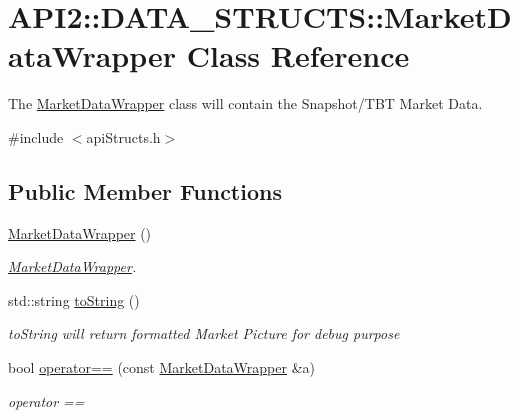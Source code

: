 \hypertarget{class_a_p_i2_1_1_d_a_t_a___s_t_r_u_c_t_s_1_1_market_data_wrapper}{\section{A\-P\-I2\-:\-:D\-A\-T\-A\-\_\-\-S\-T\-R\-U\-C\-T\-S\-:\-:Market\-Data\-Wrapper Class Reference}
\label{class_a_p_i2_1_1_d_a_t_a___s_t_r_u_c_t_s_1_1_market_data_wrapper}
}


The \hyperlink{class_a_p_i2_1_1_d_a_t_a___s_t_r_u_c_t_s_1_1_market_data_wrapper}{Market\-Data\-Wrapper} class will contain the Snapshot/\-T\-B\-T Market Data.  




{\ttfamily \#include $<$api\-Structs.\-h$>$}

\subsection*{Public Member Functions}
\begin{DoxyCompactItemize}
\item 
\hypertarget{class_a_p_i2_1_1_d_a_t_a___s_t_r_u_c_t_s_1_1_market_data_wrapper_aefd0fcbbcc35ac4d97543d62250d0534}{\hyperlink{class_a_p_i2_1_1_d_a_t_a___s_t_r_u_c_t_s_1_1_market_data_wrapper_aefd0fcbbcc35ac4d97543d62250d0534}{Market\-Data\-Wrapper} ()}\label{class_a_p_i2_1_1_d_a_t_a___s_t_r_u_c_t_s_1_1_market_data_wrapper_aefd0fcbbcc35ac4d97543d62250d0534}

\begin{DoxyCompactList}\small\item\em \hyperlink{class_a_p_i2_1_1_d_a_t_a___s_t_r_u_c_t_s_1_1_market_data_wrapper}{Market\-Data\-Wrapper}. \end{DoxyCompactList}\item 
std\-::string \hyperlink{class_a_p_i2_1_1_d_a_t_a___s_t_r_u_c_t_s_1_1_market_data_wrapper_a026ddf4c4988b38018e8f9634de5ce4b}{to\-String} ()
\begin{DoxyCompactList}\small\item\em to\-String will return formatted Market Picture for debug purpose \end{DoxyCompactList}\item 
bool \hyperlink{class_a_p_i2_1_1_d_a_t_a___s_t_r_u_c_t_s_1_1_market_data_wrapper_a92c80aea8b9dc7c934f18e52b76fcbc8}{operator==} (const \hyperlink{class_a_p_i2_1_1_d_a_t_a___s_t_r_u_c_t_s_1_1_market_data_wrapper}{Market\-Data\-Wrapper} \&a)
\begin{DoxyCompactList}\small\item\em operator == \end{DoxyCompactList}\end{DoxyCompactItemize}

